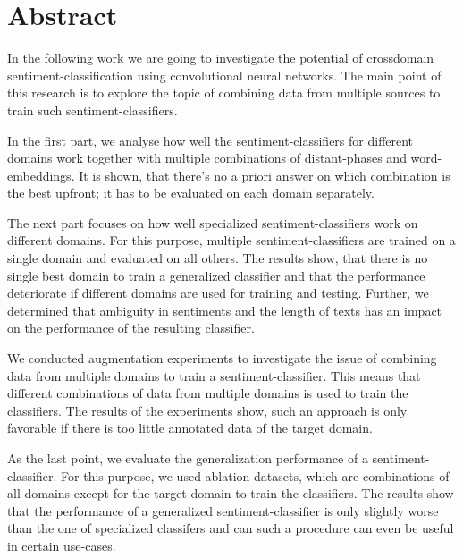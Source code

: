 \clearpage

\chapter*{Abstract}

In the following work we are going to investigate the potential of crossdomain sentiment-classification using convolutional neural networks. The main point of this research is to explore the topic of combining data from multiple sources to train such sentiment-classifiers.

In the first part, we analyse how well the sentiment-classifiers for different domains work together with multiple combinations of distant-phases and word-embeddings. It is shown, that there's no a priori answer on which combination is the best upfront; it has to be evaluated on each domain separately.

The next part focuses on how well specialized sentiment-classifiers work on different domains. For this purpose, multiple sentiment-classifiers are trained on a single domain and evaluated on all others. The results show, that there is no single best domain to train a generalized classifier and that the performance deteriorate if different domains are used for training and testing. Further, we determined that ambiguity in sentiments and the length of texts has an impact on the performance of the resulting classifier.

We conducted augmentation experiments to investigate the issue of combining data from multiple domains to train a sentiment-classifier. This means that different combinations of data from multiple domains is used to train the classifiers. The results of the experiments show, such an approach is only favorable if there is too little annotated data of the target domain.

As the last point, we evaluate the generalization performance of a sentiment-classifier. For this purpose, we used ablation datasets, which are combinations of all domains except for the target domain to train the classifiers. The results show that the performance of a generalized sentiment-classifier is only slightly worse than the one of specialized classifers and can such a procedure can even be useful in certain use-cases.
